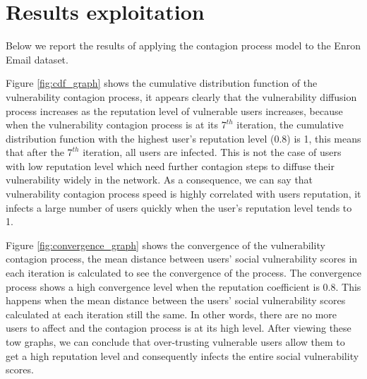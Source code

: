 \section{Results exploitation} \label{sec:Results exploitation}

Below we report the results of applying the contagion process model to the Enron Email dataset.

	
Figure \ref{fig:cdf_graph} shows the cumulative distribution function of the vulnerability contagion process,
	it appears clearly that the vulnerability diffusion process increases as the reputation level of vulnerable users increases,
	because when the vulnerability contagion process is at its $7^{th}$ iteration,
	the cumulative distribution function with the highest user's reputation level (0.8) is 1,
	this means that after the $7^{th}$ iteration,
	all users are infected.
This is not the case of users with low reputation level which need further contagion steps to diffuse their vulnerability widely in the network.
As a consequence,
	we can say that vulnerability contagion process speed is highly correlated with users reputation,
	it infects a large number of users quickly when the user's reputation level tends to 1.


Figure \ref{fig:convergence_graph} shows the convergence of the vulnerability contagion process,
	the mean distance between users' social vulnerability scores in each iteration is calculated to see the convergence of the process.
The convergence process shows a high convergence level when the reputation coefficient is 0.8.
This happens when the mean distance between the users' social vulnerability scores calculated at each iteration still the same.
In other words,
	there are no more users to affect and the contagion process is at its high level.
After viewing these tow graphs,
	we can conclude that over-trusting vulnerable users allow them to get a high reputation level and consequently infects the entire social vulnerability scores.


